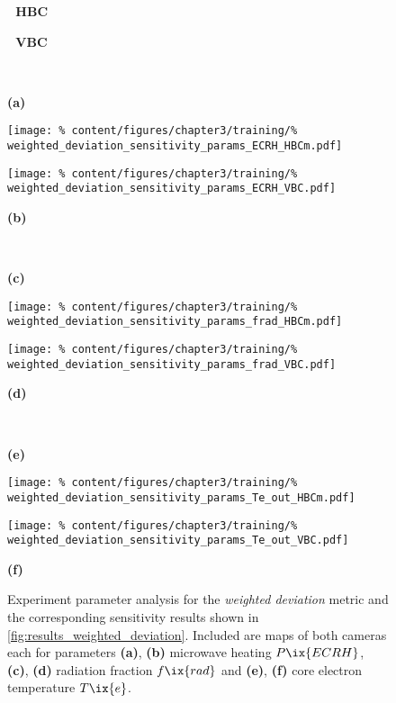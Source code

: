         \begin{figure}[t]%
            \parbox{0.44\linewidth}{%
                \centering\,\,\,\,\textbf{HBC}}%
            \quad%
            \parbox{0.44\linewidth}{%
                \centering\,\,\,\,\textbf{VBC}}%
            \,\vspace*{0.2cm}\\%
            \parbox{0.02\linewidth}{%
                \textbf{(a)}}%
            \quad%
            \parbox{0.42\linewidth}{%
                \texttt{[image: \%
                    content/figures/chapter3/training/\%
                    weighted\_deviation\_sensitivity\_params\_ECRH\_HBCm.pdf]}}%
            \quad%
            \parbox{0.42\linewidth}{%
                \texttt{[image: \%
                    content/figures/chapter3/training/\%
                    weighted\_deviation\_sensitivity\_params\_ECRH\_VBC.pdf]}}%
            \quad%
            \parbox{0.02\linewidth}{%
                \textbf{(b)}}%
            \,\\%
            \parbox{0.02\linewidth}{%
                \textbf{(c)}}%
            \quad%
            \parbox{0.42\linewidth}{%
                \texttt{[image: \%
                    content/figures/chapter3/training/\%
                    weighted\_deviation\_sensitivity\_params\_frad\_HBCm.pdf]}}%
            \quad%
            \parbox{0.42\linewidth}{%
                \texttt{[image: \%
                    content/figures/chapter3/training/\%
                    weighted\_deviation\_sensitivity\_params\_frad\_VBC.pdf]}}%
            \quad%
            \parbox{0.02\linewidth}{%
                \textbf{(d)}}%
            \,\\%
            \parbox{0.02\linewidth}{%
                \textbf{(e)}}%
            \quad%
            \parbox{0.42\linewidth}{%
                \texttt{[image: \%
                    content/figures/chapter3/training/\%
                    weighted\_deviation\_sensitivity\_params\_Te\_out\_HBCm.pdf]}}%
            \quad%
            \parbox{0.42\linewidth}{%
                \texttt{[image: \%
                    content/figures/chapter3/training/\%
                    weighted\_deviation\_sensitivity\_params\_Te\_out\_VBC.pdf]}}%
            \quad%
            \parbox{0.02\linewidth}{%
                \textbf{(f)}}%
            \caption{Experiment parameter analysis for the \textit{weighted deviation} metric and the corresponding sensitivity results shown in \cref{fig:results_weighted_deviation}. Included are maps of both cameras each for parameters \textbf{(a)}, \textbf{(b)} microwave heating $P\ix{ECRH}$, \textbf{(c)}, \textbf{(d)} radiation fraction $f\ix{rad}$ and \textbf{(e)}, \textbf{(f)} core electron temperature $T\ix{e}$.%
            }\label{fig:training_parameters}%
        \end{figure}%
